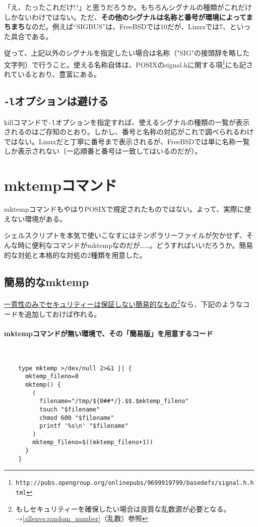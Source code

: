 「え、たったこれだけ!?」と思うだろうか。もちろんシグナルの種類がこれだけしかないわけではない。ただ、\textbf{その他のシグナルは名称と番号が環境によってまちまち}なのだ。例えば``SIGBUS''は、FreeBSDでは10だが、Linuxでは7、といった具合である。

従って、上記以外のシグナルを指定したい場合は名称（"SIG"の接頭辞を略した文字列）で行うこと。使える名称自体は、POSIXのsignal.hに関する項\footnote{\verb|http://pubs.opengroup.org/onlinepubs/9699919799/basedefs/signal.h.html|}にも記されているとおり、豊富にある。

\subsection*{\verb|-l|オプションは避ける}

killコマンドで\verb|-l|オプションを指定すれば、使えるシグナルの種類の一覧が表示されるのはご存知のとおり。しかし、番号と名称の対応がこれで調べられるわけではない。Linuxだと丁寧に番号まで表示されるが、FreeBSDでは単に名称一覧しか表示されない（一応順番と番号は一致してはいるのだが）。

\section{mktempコマンド}
\label{allenvs:mktemp}

mktempコマンドもやはりPOSIXで規定されたものではない。よって、実際に使えない環境がある。

シェルスクリプトを本気で使いこなすにはテンポラリーファイルが欠かせず、そんな時に便利なコマンドがmktempなのだが……。どうすればいいだろうか。簡易的な対処と本格的な対処の2種類を用意した。

\subsection*{簡易的なmktemp}

\underline{一意性のみでセキュリティーは保証しない簡易的なもの}\footnote{もしセキュリティーを確保したい場合は良質な乱数源が必要となる。→\ref{allenvs:random_number}（乱数）参照}なら、下記のようなコードを追加しておけば作れる。

\paragraph{mktempコマンドが無い環境で、その「簡易版」を用意するコード} 　\\
\begin{frameboxit}{160.0mm}
\begin{verbatim}
	type mktemp >/dev/null 2>&1 || {
	  mktemp_fileno=0
	  mktemp() {
	    (
	      filename="/tmp/${0##*/}.$$.$mktemp_fileno"
	      touch "$filename"
	      chmod 600 "$filename"
	      printf '%s\n' "$filename"
	    )
	    mktemp_fileno=$((mktemp_fileno+1))
	  }
	}
\end{verbatim}
\end{frameboxit}

